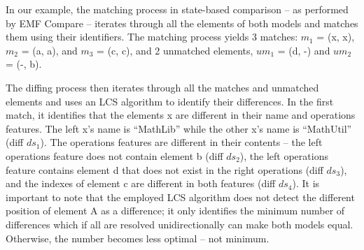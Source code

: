 \documentclass{jot}
\begin{document}
    In our example, the matching process in state-based comparison -- as performed by EMF Compare \cite{emfcompare2018developer} -- iterates through all the elements of both models and matches them using their identifiers. The matching process yields 3 matches: $m_1$ = (\textsf{x}, \textsf{x}), $m_2$ = (\textsf{a}, \textsf{a}), and $m_3$ = (\textsf{c}, \textsf{c}), and 2 unmatched elements, $um_1$ = (\textsf{d}, -) and $um_2$ = (-, \textsf{b}). 
    
    The diffing process then iterates through all the matches and unmatched elements and uses an LCS algorithm to identify their differences. In the first match, it identifies that the elements \textsf{x} are different in their \textsf{name} and \textsf{operations} features. The left \textsf{x}'s \textsf{name} is ``MathLib'' while the other \textsf{x}'s \textsf{name} is ``MathUtil'' (diff $ds_1$). The \textsf{operations} features are different in their contents -- the left \textsf{operations} feature does not contain element \textsf{b} (diff $ds_2$), the left \textsf{operations} feature contains element \textsf{d} that does not exist in the right \textsf{operations} (diff $ds_3$), and the indexes of element \textsf{c} are different in both features (diff $ds_4$). It is important to note that the employed LCS algorithm does not detect the different position of element \textsf{A} as a difference; it only identifies the minimum number of differences which if all are resolved unidirectionally can make both models equal. Otherwise, the number becomes less optimal -- not minimum.
    
\end{document}
